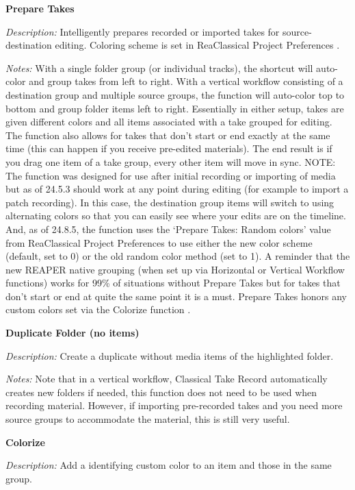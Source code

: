 \documentclass[10pt,american]{article}
\begin{document}
\textbf{Prepare Takes }

\emph{Description:} Intelligently prepares recorded or imported takes for
source-destination editing. Coloring scheme is set in ReaClassical Project
Preferences  .

\emph{Notes: }With a single folder group (or individual tracks), the shortcut
will auto-color and group takes from left to right. With a vertical workflow
consisting of a destination group and multiple source groups, the function will
auto-color top to bottom and group folder items left to right. Essentially in
either setup, takes are given different colors and all items associated with a
take grouped for editing. The function also allows for takes that don't start or
end exactly at the same time (this can happen if you receive pre-edited
materials). The end result is if you drag one item of a take group, every other
item will move in sync. NOTE: The function was designed for use after initial
recording or importing of media but as of 24.5.3 should work at any point during
editing (for example to import a patch recording). In this case, the destination
group items will switch to using alternating colors so that you can easily see
where your edits are on the timeline. And, as of 24.8.5, the function uses the
`Prepare Takes: Random colors' value from ReaClassical Project Preferences to
use either the new color scheme (default, set to 0) or the old random color
method (set to 1). A reminder that the new REAPER native grouping (when set up
via Horizontal or Vertical Workflow functions) works for 99\% of situations
without Prepare Takes but for takes that don't start or end at quite the same
point it is a must. Prepare Takes honors any custom colors set via the Colorize
function .

\textbf{Duplicate Folder (no items) }\keys{\textbackslash}

\emph{Description: }Create a duplicate without media items of the highlighted
folder.

\emph{Notes: }Note that in a vertical workflow, Classical Take Record 
automatically creates new folders if needed, this function does not need to be
used when recording material. However, if importing pre-recorded takes and you
need more source groups to accommodate the material, this is still very useful.

\textbf{Colorize }

\emph{Description: }Add a identifying custom color to an item and those in the
same group.
\end{document}

